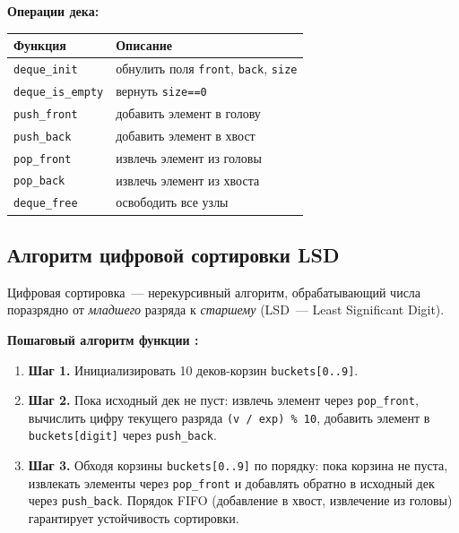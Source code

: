 \documentclass[a4paper,14pt]{extarticle}
\newcommand{\tcode}[1]{\code{#1}}
\begin{document}
\textbf{Операции дека:}

\begin{center}
\begin{tabular}{|l|l|}
\hline
\textbf{Функция} & \textbf{Описание} \\
\hline
\texttt{deque\_init}      & обнулить поля \texttt{front}, \texttt{back}, \texttt{size} \\
\hline
\texttt{deque\_is\_empty} & вернуть \texttt{size==0}                                   \\
\hline
\texttt{push\_front}      & добавить элемент в голову                                  \\
\hline
\texttt{push\_back}       & добавить элемент в хвост                                   \\
\hline
\texttt{pop\_front}       & извлечь элемент из головы                                  \\
\hline
\texttt{pop\_back}        & извлечь элемент из хвоста                                  \\
\hline
\texttt{deque\_free}      & освободить все узлы                                        \\
\hline
\end{tabular}
\end{center}

\subsection{Алгоритм цифровой сортировки LSD}

Цифровая сортировка~--- нерекурсивный алгоритм, обрабатывающий числа поразрядно от \textit{младшего} разряда к \textit{старшему} (LSD~--- Least Significant Digit).

\textbf{Пошаговый алгоритм функции \tcode{counting_sort_by_deque}:}

\begin{enumerate}
  \item \textbf{Шаг 1.} Инициализировать 10 деков-корзин \texttt{buckets[0..9]}.
  \item \textbf{Шаг 2.} Пока исходный дек не пуст: извлечь элемент через \texttt{pop\_front}, вычислить цифру текущего разряда \texttt{(v\,/\,exp)\,\%\,10}, добавить элемент в \texttt{buckets[digit]} через \texttt{push\_back}.
  \item \textbf{Шаг 3.} Обходя корзины \texttt{buckets[0..9]} по порядку: пока корзина не пуста, извлекать элементы через \texttt{pop\_front} и добавлять обратно в исходный дек через \texttt{push\_back}. Порядок FIFO (добавление в хвост, извлечение из головы) гарантирует устойчивость сортировки.
\end{enumerate}
\end{document}
